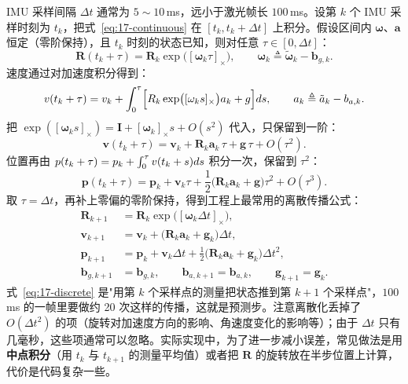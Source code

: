 IMU 采样间隔 $\Delta t$ 通常为 $5\sim10$\,ms，远小于激光帧长 $100$\,ms。设第 $k$ 个 IMU 采样时刻为 $t_k$，把式~\eqref{eq:17-continuous} 在 $[t_k,t_k+\Delta t]$ 上积分。假设区间内 $\bm{\omega}$、$\bm{a}$ 恒定（零阶保持），且 $t_k$ 时刻的状态已知，则对任意 $\tau\in[0,\Delta t]$：
\begin{equation}\label{eq:17-exp-rot}
  \bm{R}(t_k+\tau)=\bm{R}_k\exp\bigl([\bm{\omega}_k\tau]_\times\bigr),\qquad
  \bm{\omega}_k\triangleq\tilde{\bm{\omega}}_k-\bm{b}_{g,k}.
\end{equation}
速度通过对加速度积分得到：
\begin{equation}
  v(t_k+\tau)=v_k+\int_0^{\tau}\Bigl[R_k\exp\bigl([\omega_k s]_\times\bigr)a_k+g\Bigr]d s,
  \qquad a_k\triangleq\tilde{a}_k-b_{a,k}.
\end{equation}
把 $\exp([\bm{\omega}_k s]_\times)=\bm{I}+[\bm{\omega}_k]_\times s+O(s^2)$ 代入，只保留到一阶：
\begin{equation}
  \bm{v}(t_k+\tau)=\bm{v}_k+\bm{R}_k\bm{a}_k\,\tau+\bm{g}\,\tau+O(\tau^2).
\end{equation}
位置再由 $p(t_k+\tau)=p_k+\int_0^\tau v(t_k+s)d s$ 积分一次，保留到 $\tau^2$：
\begin{equation}
  \bm{p}(t_k+\tau)=\bm{p}_k+\bm{v}_k\tau+\frac12\bigl(\bm{R}_k\bm{a}_k+\bm{g}\bigr)\tau^2+O(\tau^3).
\end{equation}
取 $\tau=\Delta t$，再补上零偏的零阶保持，得到工程上最常用的离散传播公式：
\begin{equation}\label{eq:17-discrete}
  \boxed{
  \begin{aligned}
    \bm{R}_{k+1}&=\bm{R}_k\exp\bigl([\bm{\omega}_k\Delta t]_\times\bigr),\\
    \bm{v}_{k+1}&=\bm{v}_k+\bigl(\bm{R}_k\bm{a}_k+\bm{g}_k\bigr)\Delta t,\\
    \bm{p}_{k+1}&=\bm{p}_k+\bm{v}_k\Delta t+\frac12\bigl(\bm{R}_k\bm{a}_k+\bm{g}_k\bigr)\Delta t^2,\\
    \bm{b}_{g,k+1}&=\bm{b}_{g,k},\qquad \bm{b}_{a,k+1}=\bm{b}_{a,k},\qquad \bm{g}_{k+1}=\bm{g}_k.
  \end{aligned}}
\end{equation}
式~\eqref{eq:17-discrete} 是"用第 $k$ 个采样点的测量把状态推到第 $k+1$ 个采样点"，$100$\,ms 的一帧里要做约 20 次这样的传播，这就是预测步。注意离散化丢掉了 $O(\Delta t^2)$ 的项（旋转对加速度方向的影响、角速度变化的影响等）；由于 $\Delta t$ 只有几毫秒，这些项通常可以忽略。实际实现中，为了进一步减小误差，常见做法是用\textbf{中点积分}（用 $t_k$ 与 $t_{k+1}$ 的测量平均值）或者把 $\bm{R}$ 的旋转放在半步位置上计算，代价是代码复杂一些。

